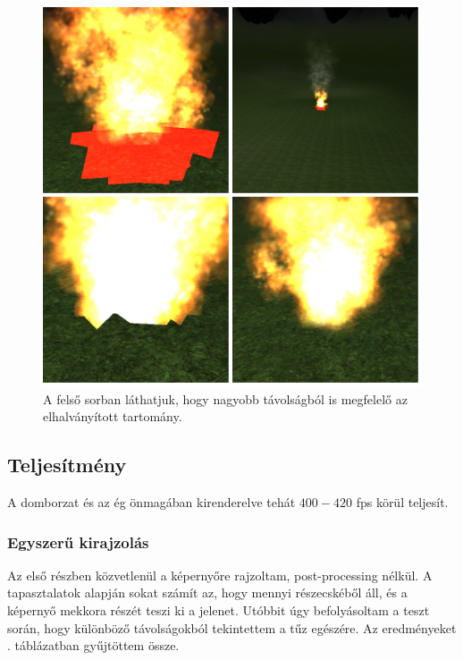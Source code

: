 \begin{figure}[h]
 \centering
 \includegraphics[width=\textwidth]{kepek/softParticle.png}
 \caption{A felső sorban láthatjuk, hogy nagyobb távolságból is megfelelő az elhalványított tartomány.}
 \label{fig:softParticle}
\end{figure}


\subsection{Teljesítmény}
A domborzat és az ég önmagában kirenderelve tehát $400-420$ fps körül teljesít.

\subsubsection{Egyszerű kirajzolás}
Az első részben közvetlenül a képernyőre rajzoltam, post-processing nélkül. A tapasztalatok alapján sokat számít az, hogy mennyi részecskéből áll, és a képernyő mekkora részét teszi ki a jelenet. Utóbbit úgy befolyásoltam a teszt során, hogy különböző távolságokból tekintettem a tűz egészére. Az eredményeket . táblázatban gyűjtöttem össze.

